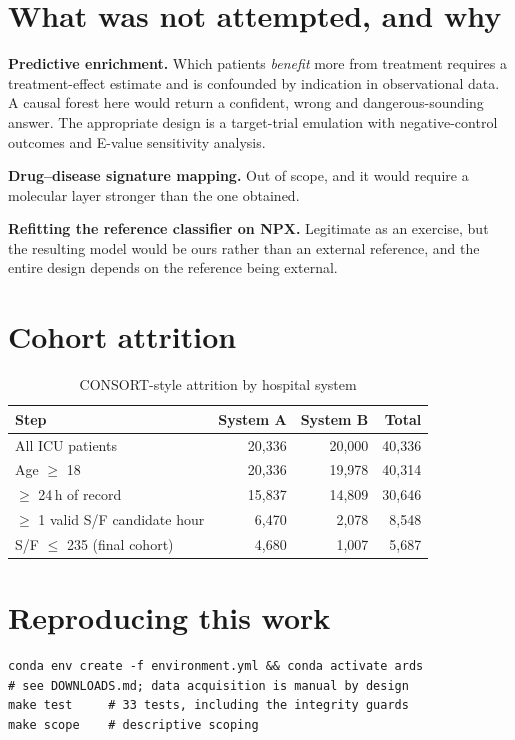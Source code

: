 \documentclass[11pt,letterpaper]{article}
\begin{document}
\section{What was not attempted, and why}

\textbf{Predictive enrichment.} Which patients \emph{benefit} more from treatment requires a
treatment-effect estimate and is confounded by indication in observational data. A causal
forest here would return a confident, wrong and dangerous-sounding answer. The appropriate
design is a target-trial emulation with negative-control outcomes and E-value sensitivity
analysis.

\textbf{Drug--disease signature mapping.} Out of scope, and it would require a molecular
layer stronger than the one obtained.

\textbf{Refitting the reference classifier on NPX.} Legitimate as an exercise, but the
resulting model would be ours rather than an external reference, and the entire design
depends on the reference being external.

\appendix
\section{Cohort attrition}

\begin{table}[H]
\centering\small
\begin{tabular}{lrrr}
\toprule
Step & System A & System B & Total \\
\midrule
All ICU patients & 20,336 & 20,000 & 40,336 \\
Age $\ge$ 18 & 20,336 & 19,978 & 40,314 \\
$\ge$ 24\,h of record & 15,837 & 14,809 & 30,646 \\
$\ge$ 1 valid S/F candidate hour & 6,470 & 2,078 & 8,548 \\
S/F $\le$ 235 (final cohort) & 4,680 & 1,007 & 5,687 \\
\bottomrule
\end{tabular}
\caption{CONSORT-style attrition by hospital system}
\label{tab:attrition}
\end{table}

\section{Reproducing this work}

\begin{verbatim}
conda env create -f environment.yml && conda activate ards
# see DOWNLOADS.md; data acquisition is manual by design
make test     # 33 tests, including the integrity guards
make scope    # descriptive scoping
\end{verbatim}
\end{document}
